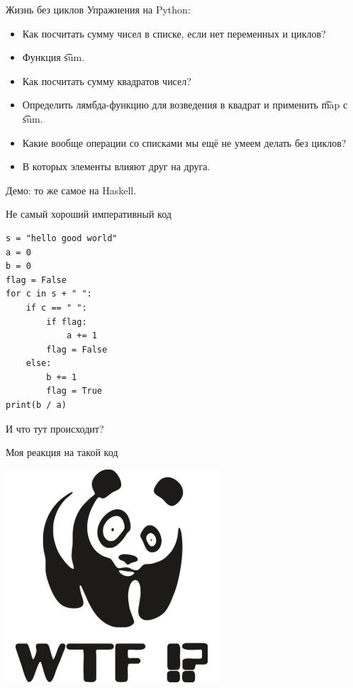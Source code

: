 \begin{frame}{Жизнь без циклов}
	Упражнения на Python:
	\begin{itemize}
		\item Как посчитать сумму чисел в списке, если нет переменных и циклов?\pause
		\item Функция \t{sum}.\pause
		\item Как посчитать сумму квадратов чисел? \pause
		\item Определить лямбда-функцию для возведения в квадрат и применить \t{map} с \t{sum}.\pause
		\item Какие вообще операции со списками мы ещё не умеем делать без циклов? \pause
		\item В которых элементы влияют друг на друга.
	\end{itemize}
	Демо: то же самое на Haskell.
\end{frame}

\begin{frame}[fragile]{Не самый хороший императивный код}
\begin{verbatim}
s = "hello good world"
a = 0
b = 0
flag = False
for c in s + " ":
    if c == " ":
        if flag:
            a += 1
        flag = False
    else:
        b += 1
        flag = True
print(b / a)
\end{verbatim}
	И что тут происходит?
\end{frame}

\begin{frame}{Моя реакция на такой код}
	\begin{center}
		\includegraphics{wtf-panda.png}
	\end{center}
\end{frame}

